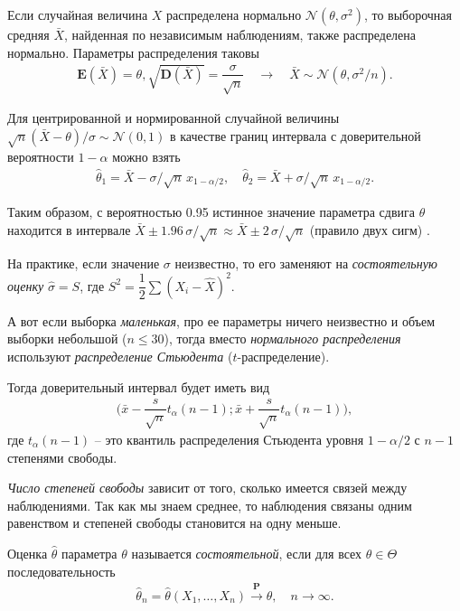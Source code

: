\documentclass[%
	11pt,
	a4paper,
	utf8,
		]{article}
\begin{document}
Если случайная величина $ X $ распределена нормально $ \mathcal{N}(\theta, \sigma^2) $, то выборочная средняя $ \bar{X} $, найденная по независимым наблюдениям, также распределена нормально. Параметры распределения таковы \cite{gmurman:1972}
\begin{align*}
	\mathbf{E}(\bar{X}) = \theta, \sqrt{\mathbf{D}(\bar{X})} = \dfrac{\sigma}{\sqrt{n}} \quad \to \quad \bar{X} \sim \mathcal{N}(\theta, \sigma^2/n).
\end{align*}

Для центрированной и нормированной случайной величины $ \sqrt{n}(\bar{X} - \theta)/\sigma \sim \mathcal{N}(0,1) $ в качестве границ интервала с доверительной вероятности $ 1 - \alpha $ можно взять
\begin{align*}
	\hat{\theta}_1 = \bar{X} - \sigma/\sqrt{n} \, x_{1 - \alpha/2}, \quad \hat{\theta}_2 = \bar{X} + \sigma/\sqrt{n} \, x_{1 - \alpha/2}.
\end{align*}

Таким образом, с вероятностью 0.95 истинное значение параметра сдвига $ \theta $ находится в интервале $ \bar{X} \pm 1.96\, \sigma/\sqrt{n} \approx \bar{X} \pm 2\, \sigma/\sqrt{n} $ (правило двух сигм) \cite[147]{lagutin:2009}.

На практике, если значение $ \sigma $ неизвестно, то его заменяют на \emph{состоятельную оценку} $ \hat{\sigma} = S $, где $ S^2 = \dfrac{1}{2}\sum (X_i - \hat{X})^2 $.

А вот если выборка \emph{маленькая}, про ее параметры ничего неизвестно и объем выборки небольшой ($ n \leqslant 30 $), тогда вместо \emph{нормального распределения} используют \emph{распределение Стьюдента} ($ t $-распределение).

Тогда доверительный интервал будет иметь вид
\begin{align*}
	\Big( \bar{x} - \dfrac{s}{\sqrt{n}} t_{\alpha}(n - 1); \bar{x} + \dfrac{s}{\sqrt{n}} t_{\alpha}(n - 1) \Big),
\end{align*}
где $ t_{\alpha}(n-1) $ -- это квантиль распределения Стьюдента уровня $ 1 - \alpha / 2 $ с $ n - 1 $ степенями свободы.


\emph{Число степеней свободы} зависит от того, сколько имеется связей между наблюдениями. Так как мы знаем среднее, то наблюдения связаны одним равенством и степеней свободы становится на одну меньше.

Оценка $ \hat{\theta} $ параметра $ \theta $ называется \emph{состоятельной}, если для всех $ \theta \in \Theta $ последовательность
\begin{align*}
	\hat{\theta}_n = \hat{\theta}(X_1, \dots, X_n) \xrightarrow{\mathbf{P}} \theta, \quad n \to \infty.
\end{align*}
\end{document}
